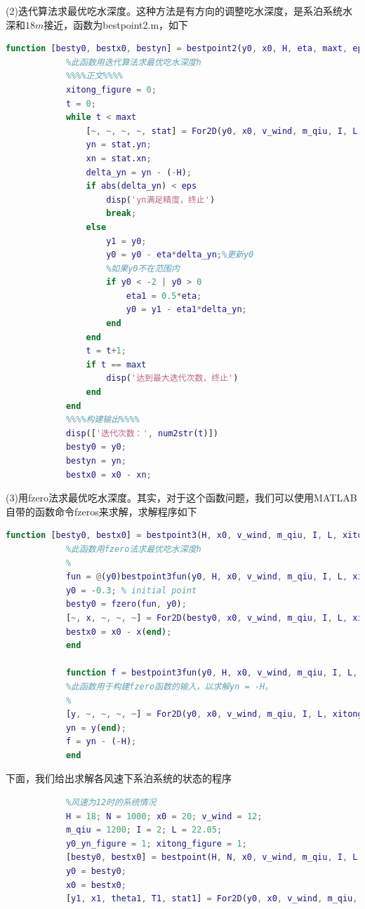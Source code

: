\documentclass[UTF8]{ctexbook}
\theoremstyle{nonumberplain}
\begin{document}
            \par
            (2)迭代算法求最优吃水深度。这种方法是有方向的调整吃水深度，是系泊系统水深和$18m$接近，函数为bestpoint2.m，如下
            \begin{lstlisting}[language = Matlab]
            function [besty0, bestx0, bestyn] = bestpoint2(y0, x0, H, eta, maxt, eps, v_wind, m_qiu, I, L)
            %此函数用迭代算法求最优吃水深度h
            %%%%正文%%%%
            xitong_figure = 0;
            t = 0;
            while t < maxt
                [~, ~, ~, ~, stat] = For2D(y0, x0, v_wind, m_qiu, I, L, xitong_figure);
                yn = stat.yn;
                xn = stat.xn;
                delta_yn = yn - (-H);
                if abs(delta_yn) < eps
                    disp('yn满足精度，终止')
                    break;
                else
                    y1 = y0;
                    y0 = y0 - eta*delta_yn;%更新y0
                    %如果y0不在范围内
                    if y0 < -2 | y0 > 0
                        eta1 = 0.5*eta;
                        y0 = y1 - eta1*delta_yn;
                    end
                end
                t = t+1;
                if t == maxt
                    disp('达到最大迭代次数，终止')
                end
            end
            %%%%构建输出%%%%
            disp(['迭代次数：', num2str(t)])
            besty0 = y0;
            bestyn = yn;
            bestx0 = x0 - xn;
            \end{lstlisting}
            \par
            (3)用fzero法求最优吃水深度。其实，对于这个函数问题，我们可以使用MATLAB自带的函数命令fzeros来求解，求解程序如下
            \begin{lstlisting}[language = Matlab]
            function [besty0, bestx0] = bestpoint3(H, x0, v_wind, m_qiu, I, L, xitong_figure)
            %此函数用fzero法求最优吃水深度h
            %
            fun = @(y0)bestpoint3fun(y0, H, x0, v_wind, m_qiu, I, L, xitong_figure);
            y0 = -0.3; % initial point
            besty0 = fzero(fun, y0);
            [~, x, ~, ~, ~] = For2D(besty0, x0, v_wind, m_qiu, I, L, xitong_figure);
            bestx0 = x0 - x(end);
            end

            function f = bestpoint3fun(y0, H, x0, v_wind, m_qiu, I, L, xitong_figure)
            %此函数用于构建fzero函数的输入，以求解yn = -H。
            %
            [y, ~, ~, ~, ~] = For2D(y0, x0, v_wind, m_qiu, I, L, xitong_figure);
            yn = y(end);
            f = yn - (-H);
            end
            \end{lstlisting}
            \par
            下面，我们给出求解各风速下系泊系统的状态的程序
            \begin{lstlisting}[language = Matlab]
            %% 利用离散枚举法计算bestx0, besty0情况下的系统信息及系统图形
            %风速为12时的系统情况
            H = 18; N = 1000; x0 = 20; v_wind = 12;
            m_qiu = 1200; I = 2; L = 22.05;
            y0_yn_figure = 1; xitong_figure = 1;
            [besty0, bestx0] = bestpoint(H, N, x0, v_wind, m_qiu, I, L, y0_yn_figure);
            y0 = besty0;
            x0 = bestx0;
            [y1, x1, theta1, T1, stat1] = For2D(y0, x0, v_wind, m_qiu, I, L, xitong_figure);
            \end{lstlisting}
\end{document}
